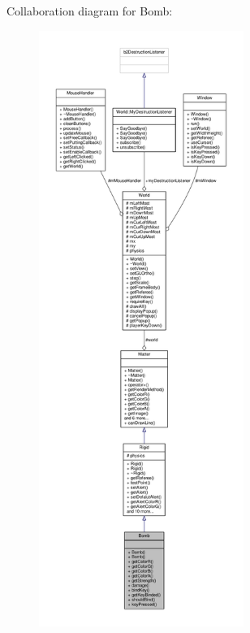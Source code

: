 Collaboration diagram for Bomb\+:\nopagebreak
\begin{figure}[H]
\begin{center}
\leavevmode
\includegraphics[height=550pt]{classBomb__coll__graph}
\end{center}
\end{figure}
